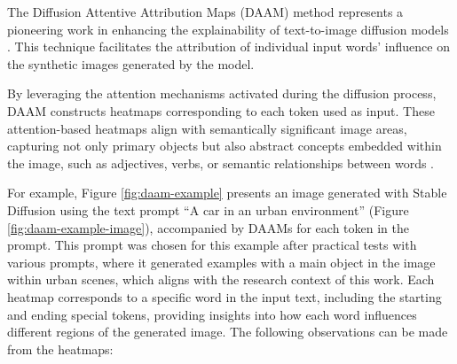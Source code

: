 The Diffusion Attentive Attribution Maps (DAAM) method represents a pioneering work in enhancing the explainability of text-to-image diffusion models \cite{DAAM}. This technique facilitates the attribution of individual input words' influence on the synthetic images generated by the model.

By leveraging the attention mechanisms activated during the diffusion process, 
DAAM constructs heatmaps corresponding to each token used as input.
These attention-based heatmaps align with semantically significant image areas, capturing not only primary objects but also abstract concepts embedded within the image, such as adjectives, verbs, or semantic relationships between words \cite{DAAM}.

For example, Figure \ref{fig:daam-example} presents an image generated with Stable Diffusion \cite{rombach2022high} using the text prompt ``A car in an urban environment'' (Figure \ref{fig:daam-example-image}), accompanied by DAAMs for each token in the prompt.  This prompt was chosen for this example after practical tests with various prompts, where it generated examples with a main object in the image within urban scenes, which aligns with the research context of this work. Each heatmap corresponds to a specific word in the input text, including the starting and ending special tokens, providing insights into how each word influences different regions of the generated image.
The following observations can be made from the heatmaps:


